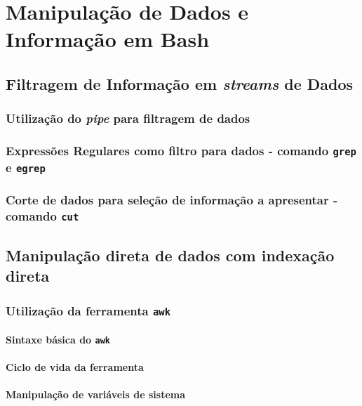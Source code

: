 \documentclass[a4paper, onecolumn, 10pt]{report}
\begin{document}
\chapter{Manipulação de Dados e Informação em Bash}

\section{Filtragem de Informação em \textit{streams} de Dados}

\subsection{Utilização do \textit{pipe} para filtragem de dados}

\subsection{Expressões Regulares como filtro para dados - comando \texttt{grep} e \texttt{egrep}}

\subsection{Corte de dados para seleção de informação a apresentar - comando \texttt{cut}}

\section{Manipulação direta de dados com indexação direta}

\subsection{Utilização da ferramenta \texttt{awk}}

\subsubsection{Sintaxe básica do \texttt{awk}}

\subsubsection{Ciclo de vida da ferramenta}

\subsubsection{Manipulação de variáveis de sistema}
\end{document}

